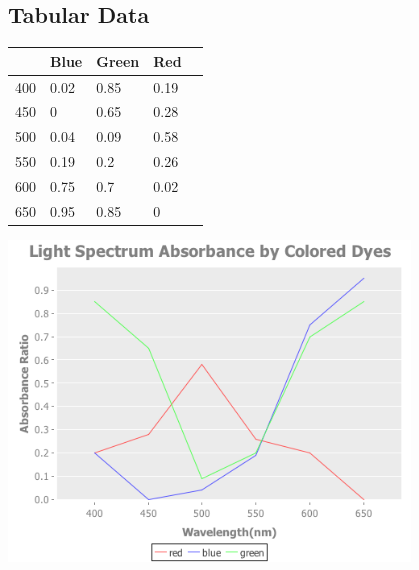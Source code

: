 \documentclass{article}%
\begin{document}
\begin{center}

    \section*{Tabular Data}

    \begin{tabular}{| l | l | l | l | l |}
        \hline
        & Blue  & Green  & Red  \\ \hline
        400         & 0.02  & 0.85  & 0.19  \\ \hline
        450         & 0     & 0.65  & 0.28  \\ \hline
        500         & 0.04  & 0.09  & 0.58  \\ \hline
        550         & 0.19  & 0.2   & 0.26  \\ \hline
        600         & 0.75  & 0.7   & 0.02  \\ \hline
        650         & 0.95  & 0.85  & 0     \\ \hline
    \end{tabular}

    \vspace{10mm}

    \includegraphics[width=0.8\textwidth]{./charts/absorbance.png}
\end{center}
\end{document}
